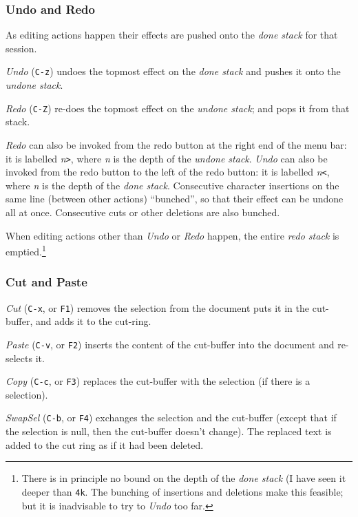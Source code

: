 \documentclass[11pt,a4paper]{article}
\begin{document}
\hypertarget{undo-and-redo}{%
\subsubsection{Undo and Redo}\label{undo-and-redo}}

As editing actions happen their effects are pushed onto the \emph{done
stack} for that session.

\emph{Undo} (\texttt{C-z}) undoes the topmost effect on the \emph{done
stack} and pushes it onto the \emph{undone stack}.

\emph{Redo} (\texttt{C-Z}) re-does the topmost effect on the
\emph{undone stack}; and pops it from that stack.

\emph{Redo} can also be invoked from the redo button at the right
end of the menu bar: it is labelled \emph{n}\texttt{\textgreater{}},
where \emph{n} is the depth of the \emph{undone stack}. \emph{Undo}
can also be invoked from the redo button to the left of the redo
button: it is labelled \emph{n}\texttt{\textless{}}, where \emph{n}
is the depth of the \emph{done stack}. Consecutive character
insertions on the same line (between other actions) ``bunched'',
so that their effect can be undone all at once. Consecutive cuts
or other deletions are also bunched.

When editing actions other than \emph{Undo} or \emph{Redo} happen,
the entire \emph{redo stack} is emptied.\footnote{There is in
principle no bound on the depth of the \emph{done stack} (I have
seen it deeper than \texttt{4k}. The bunching of insertions and
deletions make this feasible; but it is inadvisable to try to
\emph{Undo} too far.}



\hypertarget{cut-and-paste}{%
\subsubsection{Cut and Paste}\label{cut-and-paste}}

\emph{Cut} (\texttt{C-x}, or \texttt{F1}) removes the selection from the
document puts it in the cut-buffer, and adds it to the cut-ring.

\emph{Paste} (\texttt{C-v}, or \texttt{F2}) inserts the content of the
cut-buffer into the document and re-selects it.

\emph{Copy} (\texttt{C-c}, or \texttt{F3}) replaces the cut-buffer with
the selection (if there is a selection).

\emph{SwapSel} (\texttt{C-b}, or \texttt{F4}) exchanges the selection
and the cut-buffer (except that if the selection is null, then the
cut-buffer doesn't change). The replaced text is added to the cut ring
as if it had been deleted.
\end{document}
